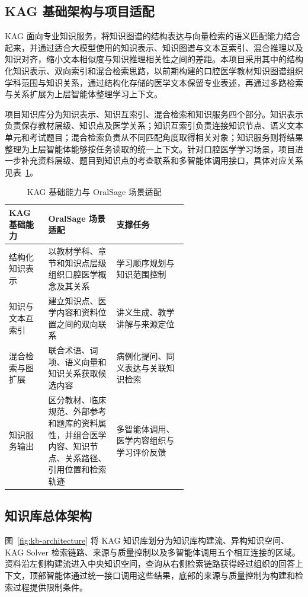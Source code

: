 \subsection{KAG 基础架构与项目适配}

KAG 面向专业知识服务，将知识图谱的结构表达与向量检索的语义匹配能力结合起来，并通过适合大模型使用的知识表示、知识图谱与文本互索引、混合推理以及知识对齐，缩小文本相似度与知识推理相关性之间的差距\cite{liang2024kag}。本项目采用其中的结构化知识表示、双向索引和混合检索思路，以前期构建的口腔医学教材知识图谱组织学科范围与知识关系，通过结构化存储的医学文本保留专业表述，再通过多路检索与关系扩展为上层智能体整理学习上下文。

项目知识库分为知识表示、知识互索引、混合检索和知识服务四个部分。知识表示负责保存教材层级、知识点及医学关系；知识互索引负责连接知识节点、语义文本单元和考试题目；混合检索负责从不同匹配角度取得相关对象；知识服务则将结果整理为上层智能体能够按任务读取的统一上下文。针对口腔医学学习场景，项目进一步补充资料层级、题目到知识点的考查联系和多智能体调用接口，具体对应关系见表~\ref{tab:kag-adaptation}。

\begin{table}[H]
  \centering
  \caption{KAG 基础能力与 OralSage 场景适配}
  \label{tab:kag-adaptation}
  \begin{tabularx}{\linewidth}{p{0.22\linewidth}p{0.38\linewidth}X}
    \toprule
    KAG 基础能力 & OralSage 场景适配 & 支撑任务 \\
    \midrule
    结构化知识表示 & 以教材学科、章节和知识点层级组织口腔医学概念及其关系 & 学习顺序规划与知识范围控制 \\
    知识与文本互索引 & 建立知识点、医学内容和资料位置之间的双向联系 & 讲义生成、教学讲解与来源定位 \\
    混合检索与图扩展 & 联合术语、词项、语义向量和知识关系获取候选内容 & 病例化提问、同义表达与关联知识检索 \\
    知识服务输出 & 区分教材、临床规范、外部参考和题库的资料属性，并组合医学内容、知识节点、关系路径、引用位置和检索轨迹 & 多智能体调用、医学内容组织与学习评价反馈 \\
    \bottomrule
  \end{tabularx}
\end{table}

\subsection{知识库总体架构}

图~\ref{fig:kb-architecture} 将 KAG 知识库划分为知识库构建流、异构知识空间、KAG Solver 检索链路、来源与质量控制以及多智能体调用五个相互连接的区域。资料沿左侧构建流进入中央知识空间，查询从右侧检索链路获得经过组织的回答上下文，顶部智能体通过统一接口调用这些结果，底部的来源与质量控制为构建和检索过程提供限制条件。

